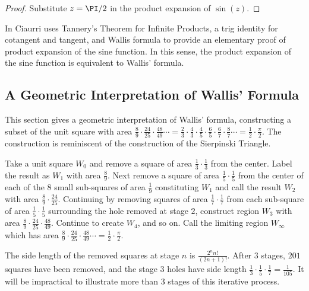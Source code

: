\documentclass[12pt]{article}
\begin{document}
\begin{proof}
    Substitute \( z = \PI/2 \) in the product expansion of \( \sin(z) \).
\end{proof}

\begin{remark}
    In
    \cite{ciaurri15} Ciaurri uses Tannery's Theorem for Infinite
    Products, a trig identity for cotangent and tangent, and Wallis
    formula to provide an elementary proof of product expansion of the
    sine function.  In this sense, the product expansion of the sine
    function is equivalent to Wallis' formula.
\end{remark}

\subsection*{A Geometric Interpretation of Wallis' Formula}

This section gives a geometric interpretation of Wallis' formula,
constructing a subset of the unit square with area \( \frac{8}{9} \cdot
\frac{24}{25} \cdot \frac{48}{49} \cdots = \frac{2}{3} \cdot \frac{4}{3}
\cdot \frac{4}{5} \cdot \frac{6}{5} \cdot \frac{6}{7} \cdot \frac{8}{7}
\cdots = \frac{1}{2} \cdot \frac{\pi}{2} \).  The construction is
reminiscent of the construction of the Sierpinski Triangle.

Take a unit square \( W_0 \) and remove a square of area \( \frac{1}{3}
\cdot \frac{1}{3} \) from the center.  Label the result as \( W_1 \)
with area \( \frac{8}{9} \).  Next remove a square of area \( \frac{1}{5}
\cdot \frac{1}{5} \) from the center of each of the \( 8 \) small
sub-squares of area \( \frac{1}{9} \) constituting \( W_1 \) and call
the result \( W_2 \) with area \( \frac{8}{9} \cdot \frac{24}{25} \).
Continuing by removing squares of area \( \frac{1}{7} \cdot \frac{1}{7} \)
from each sub-square of area \( \frac{1}{5} \cdot \frac{1}{5} \)
surrounding the hole removed at stage \( 2 \), construct region \( W_3 \)
with area \( \frac{8}{9} \cdot \frac{24}{25} \cdot \frac{48}{49} \).
Continue to create \( W_4 \), and so on.  Call the limiting region \( W_
{\infty} \) which has area \( \frac{8}{9} \cdot \frac{24}{25} \cdot
\frac{48}{49} \cdots = \frac{1}{2} \cdot \frac{\pi}{2} \).

The side length of the removed squares at stage \( n \) is \( \frac{2^n
n!}{(2n+1)!} \).  After \( 3 \) stages, \( 201 \) squares have been
removed, and the stage \( 3 \) holes have side length \( \frac{1}{3}
\cdot \frac{1}{5} \cdot \frac{1}{7} = \frac{1}{105} \).  It will be
impractical to illustrate more than \( 3 \) stages of this iterative
process.
\end{document}

